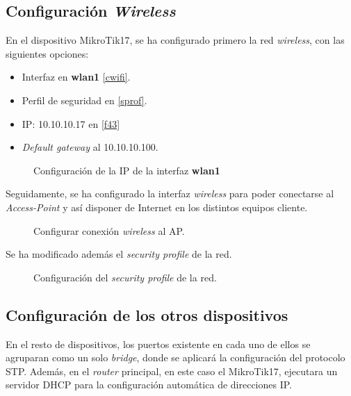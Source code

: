 \subsection{Configuración \textit{Wireless}}

En el dispositivo MikroTik17, se ha configurado primero la red \textit{wireless}, con las siguientes opciones:

\begin{itemize}
	\item Interfaz en \textbf{wlan1} \autoref{cwifi}.
	\item Perfil de seguridad en \autoref{sprof}.
	\item IP: 10.10.10.17 en  \autoref{f43}
	\item \textit{Default gateway} al 10.10.10.100.
\end{itemize}

\begin{figure}[h!]\centering
	\caption{Configuración de la IP de la interfaz \textbf{wlan1}}
	\label{f43}
	\bigskip
\end{figure}

Seguidamente, se ha configurado la interfaz \textit{wireless} para poder conectarse al \textit{Access-Point} y así disponer de Internet en los distintos equipos cliente.

\begin{figure}[h!]\centering
	\caption{Configurar conexión \textit{wireless} al AP.}
	\label{cwifi}
	\bigskip
\end{figure}

Se ha modificado además el \textit{security profile} de la red.

\begin{figure}[h!]\centering
	\caption{Configuración del \textit{security profile} de la red.}
	\label{sprof}
	\bigskip
\end{figure}

\clearpage
\subsection{Configuración de los otros dispositivos}

En el resto de dispositivos, los puertos existente en cada uno de ellos se agruparan como un solo \textit{bridge}, donde se aplicará la configuración del protocolo STP. Además, en el \textit{router} principal, en este caso el MikroTik17, ejecutara un servidor DHCP para la configuración automática de direcciones IP.


